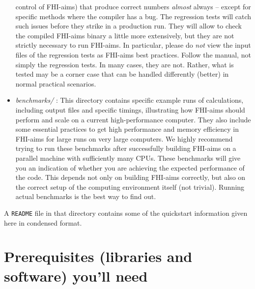 \begin{itemize}
    control of FHI-aims) that produce correct numbers \emph{almost}
    always -- except for specific methods where the compiler has a
    bug. The regression tests will catch such issues before they
    strike in a production run. They 
    will allow to check the compiled FHI-aims binary a little more
    extensively, but they are not strictly necessary to run
    FHI-aims. In particular, please do \emph{not} view the input files
    of the regression tests as FHI-aims best practices. Follow the
    manual, not simply the regression tests. In many cases,
    they are not. Rather, what is tested may be a corner case that can
    be handled differently (better) in normal practical scenarios.
  \item \emph{benchmarks/} : This directory contains specific example
    runs of calculations, including output files and specific timings,
    illustrating how FHI-aims should perform and scale on a current
    high-performance computer. They also include some essential
    practices to get high performance and memory efficiency in
    FHI-aims for large runs on very large computers. We highly
    recommend trying to 
    run these benchmarks after successfully building FHI-aims on a
    parallel machine with sufficiently many CPUs. These benchmarks
    will give you an indication of whether you are achieving the
    expected performance of the code. This depends not only on
    building FHI-aims correctly, but also on the correct setup of the
    computing environment itself (not trivial). Running actual
    benchmarks is the best way to find out.
\end{itemize}
A \texttt{README} file in that directory contains some of the quickstart information
given here in condensed format. 

\section{Prerequisites (libraries and software) you'll need}
\label{Sec:prerequisites}


